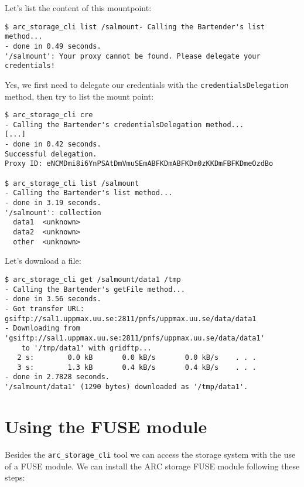 \documentclass{book}
\begin{document}
Let's list the content of this mountpoint:

\begin{verbatim}
$ arc_storage_cli list /salmount- Calling the Bartender's list method...
- done in 0.49 seconds.
'/salmount': Your proxy cannot be found. Please delegate your credentials!
\end{verbatim}

Yes, we first need to delegate our credentials with the \verb!credentialsDelegation! method, then try to list the mount point:

\begin{verbatim}
$ arc_storage_cli cre
- Calling the Bartender's credentialsDelegation method...
[...]
- done in 0.42 seconds.
Successful delegation.
Proxy ID: eNCMDmi8i6YnPSAtDmVmuSEmABFKDmABFKDm0zKKDmFBFKDmeOzdBo

$ arc_storage_cli list /salmount
- Calling the Bartender's list method...
- done in 3.19 seconds.
'/salmount': collection
  data1  <unknown>
  data2  <unknown>
  other  <unknown>
\end{verbatim}

Let's download a file:

\begin{verbatim}
$ arc_storage_cli get /salmount/data1 /tmp
- Calling the Bartender's getFile method...
- done in 3.56 seconds.
- Got transfer URL: gsiftp://sal1.uppmax.uu.se:2811/pnfs/uppmax.uu.se/data/data1
- Downloading from 'gsiftp://sal1.uppmax.uu.se:2811/pnfs/uppmax.uu.se/data/data1'
    to '/tmp/data1' with gridftp...
   2 s:        0.0 kB       0.0 kB/s       0.0 kB/s    . . .       
   3 s:        1.3 kB       0.4 kB/s       0.4 kB/s    . . .       
- done in 2.7828 seconds.
'/salmount/data1' (1290 bytes) downloaded as '/tmp/data1'.
\end{verbatim}

\section{Using the FUSE module} %
\label{sec:using_the_fuse_module}

Besides the \verb!arc_storage_cli! tool we can access the storage system with the use of a FUSE module. We can install the ARC storage FUSE module following these steps:
\end{document}

